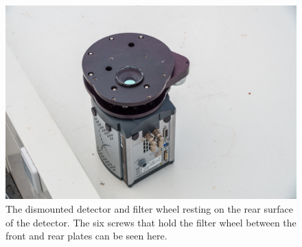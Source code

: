 \begin{figure}
\begin{center}
\includegraphics[width=0.8\linewidth]{figures/huitzi-f8-off-telescope.jpg}
\end{center}
\caption{The dismounted detector and filter wheel resting on the rear surface of the detector. The six screws that hold the filter wheel between the front and rear plates can be seen here.}
\label{figure:huitzi-f8-off-telescope}
\end{figure}

